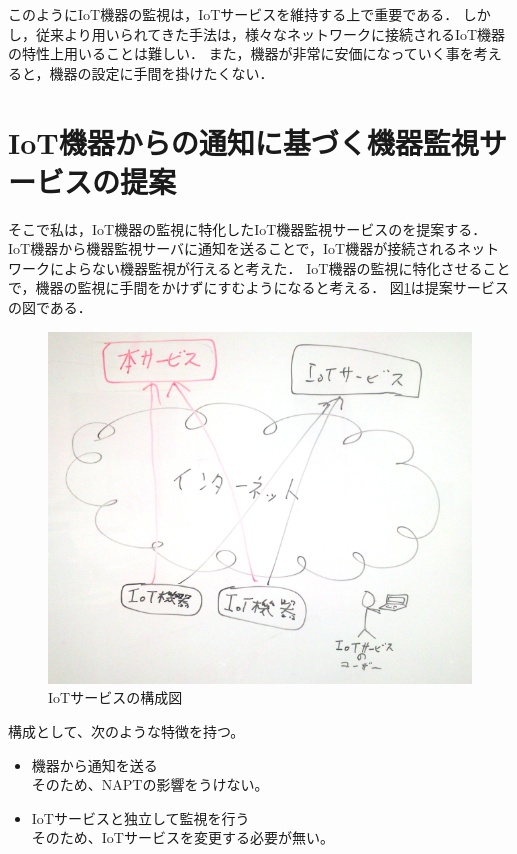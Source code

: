 このようにIoT機器の監視は，IoTサービスを維持する上で重要である．
しかし，従来より用いられてきた手法は，様々なネットワークに接続されるIoT機器の特性上用いることは難しい．
また，機器が非常に安価になっていく事を考えると，機器の設定に手間を掛けたくない．

\section{IoT機器からの通知に基づく機器監視サービスの提案}
そこで私は，IoT機器の監視に特化したIoT機器監視サービスのを提案する．
IoT機器から機器監視サーバに通知を送ることで，IoT機器が接続されるネットワークによらない機器監視が行えると考えた．
IoT機器の監視に特化させることで，機器の監視に手間をかけずにすむようになると考える．
図\ref{fig:proposal_system}は提案サービスの図である．

\begin{figure}[htbp]
\includegraphics[width=14cm]{images/proposal_system.png}
\caption{IoTサービスの構成図}
\label{fig:proposal_system}
\end{figure}

構成として、次のような特徴を持つ。
\begin{itemize}
	\item 機器から通知を送る\\
		そのため、NAPTの影響をうけない。
	\item IoTサービスと独立して監視を行う\\
		そのため、IoTサービスを変更する必要が無い。
\end{itemize}

